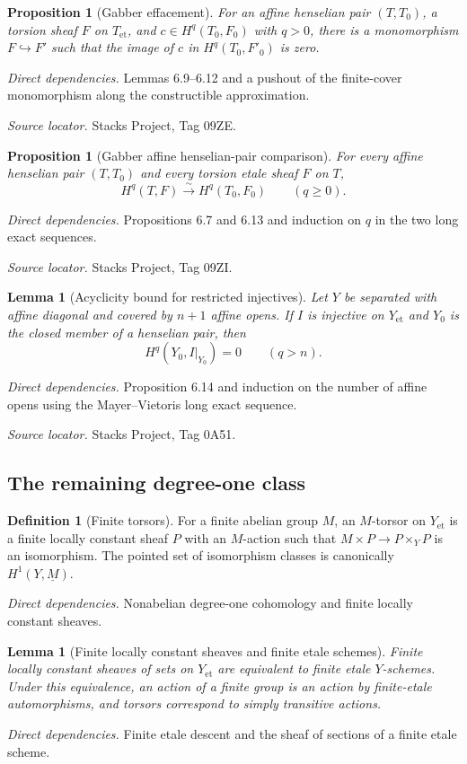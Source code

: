 \documentclass[10pt]{article}
\newtheorem{proposition}[theorem]{Proposition}
\newtheorem{lemma}[theorem]{Lemma}
\theoremstyle{definition}
\newtheorem{definition}[theorem]{Definition}
\newcommand{\Et}{\mathrm{et}}
\newcommand{\deps}[1]{\par\smallskip\textit{Direct dependencies.} #1\par}
\newcommand{\sources}[1]{\par\textit{Source locator.} #1\par}
\begin{document}
\begin{proposition}[Gabber effacement]
For an affine henselian pair $(T,T_0)$, a torsion sheaf $F$ on $T_{\Et}$,
and $c\in H^q(T_0,F_0)$ with $q>0$, there is a monomorphism
$F\hookrightarrow F'$ such that the image of $c$ in
$H^q(T_0,F'_0)$ is zero.
\end{proposition}
\deps{Lemmas 6.9--6.12 and a pushout of the finite-cover monomorphism along
the constructible approximation.}
\sources{Stacks Project, Tag 09ZE.}

\begin{proposition}[Gabber affine henselian-pair comparison]
For every affine henselian pair $(T,T_0)$ and every torsion etale sheaf
$F$ on $T$,
\[
 H^q(T,F)\xrightarrow{\sim}H^q(T_0,F_0)
 \qquad(q\geq0).
\]
\end{proposition}
\deps{Propositions 6.7 and 6.13 and induction on $q$ in the two long exact
sequences.}
\sources{Stacks Project, Tag 09ZI.}

\begin{lemma}[Acyclicity bound for restricted injectives]
Let $Y$ be separated with affine diagonal and covered by $n+1$ affine
opens.  If $I$ is injective on $Y_{\Et}$ and $Y_0$ is the closed member of
a henselian pair, then
\[
 H^q(Y_0,I|_{Y_0})=0\qquad(q>n).
\]
\end{lemma}
\deps{Proposition 6.14 and induction on the number of affine opens using
the Mayer--Vietoris long exact sequence.}
\sources{Stacks Project, Tag 0A51.}

\subsection{The remaining degree-one class}

\begin{definition}[Finite torsors]
For a finite abelian group $M$, an $M$-torsor on $Y_{\Et}$ is a finite
locally constant sheaf $P$ with an $M$-action such that
$M\times P\to P\times_YP$ is an isomorphism.  The pointed set of
isomorphism classes is canonically $H^1(Y,\underline M)$.
\end{definition}
\deps{Nonabelian degree-one cohomology and finite locally constant
sheaves.}

\begin{lemma}[Finite locally constant sheaves and finite etale schemes]
Finite locally constant sheaves of sets on $Y_{\Et}$ are equivalent to
finite etale $Y$-schemes.  Under this equivalence, an action of a finite
group is an action by finite-etale automorphisms, and torsors correspond to
simply transitive actions.
\end{lemma}
\deps{Finite etale descent and the sheaf of sections of a finite etale
scheme.}
\end{document}
